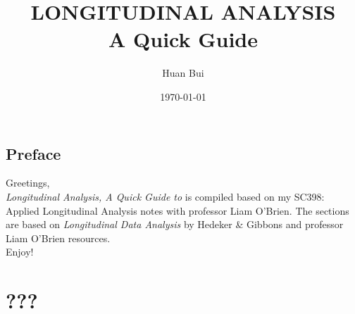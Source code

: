 \documentclass{article}
\theoremstyle{definition}
\begin{document}
	\begin{titlepage}\centering
		\clearpage
		\title{\textsc{\bf{LONGITUDINAL ANALYSIS}}\\\smallskip A Quick Guide\\}
		\author{\bigskip Huan Bui}
		\date{\today}
		\maketitle
		\thispagestyle{empty}
	\end{titlepage}

\newpage

\subsection*{Preface}

Greetings,\\

\textit{Longitudinal Analysis, A Quick Guide to} is compiled based on my SC398: Applied Longitudinal Analysis notes with professor Liam O'Brien. The sections are based on \textit{Longitudinal Data Analysis} by Hedeker \& Gibbons and professor Liam O'Brien resources. \\

Enjoy!


\newpage
\tableofcontents
\newpage

\section{???}

\newpage
\end{document}
